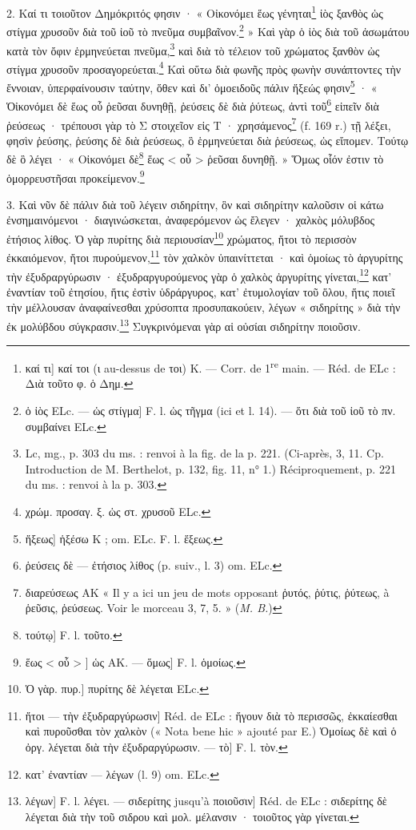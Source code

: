 \documentclass[landscape, a4paper, 11pt, oneside, polutonikogreek, french]{article}
\begin{document}
2. Καί τι τοιοῦτον Δημόκριτός φησιν · « Οἰκονόμει ἕως γένηται\footnote{καί τι] καί τοι (ι au-dessus de τοι) K. --- Corr. de 1\textsuperscript{re} main. --- Réd. de ELc : Διὰ τοῦτο φ. ὁ Δημ.} ἰὸς ξανθὸς ὡς στίγμα χρυσοῦν διὰ τοῦ ἰοῦ τὸ πνεῦμα συμβαῖνον.\footnote{ὁ ἰὸς ELc. --- ὡς στίγμα] F. l. ὡς τῆγμα (ici et l. 14). --- ὅτι διὰ τοῦ ἰοῦ τὸ πν. συμβαίνει ELc.} » Καὶ γὰρ ὁ ἰὸς διὰ τοῦ ἀσωμάτου κατὰ τὸν ὄφιν ἑρμηνεύεται πνεῦμα,\footnote{Lc, mg., p. 303 du ms. : renvoi à la fig. de la p. 221. (Ci-après, 3, 11. Cp. Introduction de M. Berthelot, p. 132, fig. 11, n° 1.) Réciproquement, p. 221 du ms. : renvoi à la p. 303.} καὶ διὰ τὸ τέλειον τοῦ χρώματος ξανθὸν ὠς στίγμα χρυσοῦν προσαγορεύεται.\footnote{χρώμ. προσαγ. ξ. ὡς στ. χρυσοῦ ELc.} Καὶ οὕτω διὰ φωνῆς πρὸς φωνὴν συνάπτοντες τὴν ἔννοιαν, ὑπερφαίνουσιν ταύτην, ὅθεν καὶ δι' ὁμοειδοῦς πάλιν ἥξεώς φησιν\footnote{ἥξεως] ἡξέσω K ; om. ELc. F. l. ἕξεως.} · « Ὁἰκονόμει δὲ ἕως οὗ ῥεῦσαι δυνηθῇ, ῥεύσεις δὲ διὰ ῥύτεως, ἀντὶ τοῦ\footnote{ῥεύσεις δὲ --- ἐτήσιος λίθος (p. suiv., l. 3) om. ELc.} εἰπεῖν διὰ ῥεύσεως · τρέπουσι γὰρ τὸ Σ στοιχεῖον εἰς Τ · χρησάμενος\footnote{διαρεύσεως AK « Il y a ici un jeu de mots opposant ῥυτός, ῥύτις, ῥύτεως, à ῥεῦσις, ῥεύσεως. Voir le morceau 3, 7, 5. » (\emph{M. B.})} (f. 169 r.) τῇ λέξει, φησὶν ῥεύσης, ῥεύσης δὲ διὰ ῥεύσεως, ὃ ἑρμηνεύεται διὰ ῥεύσεως, ὡς εἴπομεν. Τούτῳ δὲ ὃ λέγει · « Οἰκονόμει δὲ\footnote{τούτῳ] F. l. τοῦτο.} ἕως < οὗ > ῥεῦσαι δυνηθῇ. » Ὅμως οἷόν ἐστιν τὸ ὁμορρευστῆσαι προκείμενον.\footnote{ἕως < οὗ > ] ὡς AK. --- ὅμως] F. l. ὁμοίως.}

3. Καὶ νῦν δὲ πάλιν διὰ τοῦ λέγειν σιδηρίτην, ὃν καὶ σιδηρίτην καλοῦσιν οἱ κάτω ἐνσημαινόμενοι · διαγινώσκεται, ἀναφερόμενον ὡς ἔλεγεν · χαλκὸς μόλυβδος ἐτήσιος λίθος. Ὁ γὰρ πυρίτης διὰ περιουσίαν\footnote{Ὁ γὰρ. πυρ.] πυρίτης δὲ λέγεται ELc.} χρώματος, ἤτοι τὸ περισσὸν ἐκκαιόμενον, ἤτοι πυρούμενον,\footnote{ἤτοι --- τὴν ἐξυδραργύρωσιν] Réd. de ELc : ἤγουν διὰ τὸ περισσῶς, ἐκκαίεσθαι καὶ πυροῦσθαι τὸν χαλκὸν (« Nota bene hic » ajouté par E.) Ὁμοίως δὲ καὶ ὁ ὀργ. λέγεται διὰ τὴν ἐξυδραργύρωσιν. --- τὸ] F. l. τὸν.} τὸν χαλκὸν ὑπαινίττεται · καὶ ὁμοίως τὸ ἀργυρίτης τὴν ἐξυδραργύρωσιν · ἐξυδραργυρούμενος γὰρ ὁ χαλκὸς ἀργυρίτης γίνεται,\footnote{κατ' ἐναντίαν --- λέγων (l. 9) om. ELc.} κατ' ἐναντίαν τοῦ ἐτησίου, ἥτις ἐστὶν ὑδράργυρος, κατ' ἐτυμολογίαν τοῦ ὅλου, ἥτις ποιεῖ τὴν μέλλουσαν ἀναφαίνεσθαι χρύσοπτα προσυπακούειν, λέγων « σιδηρίτης » διὰ τὴν ἐκ μολύβδου σύγκρασιν.\footnote{λέγων] F. l. λέγει. --- σιδερίτης jusqu'à ποιοῦσιν] Réd. de ELc : σιδερίτης δὲ λέγεται διὰ τὴν τοῦ σιδρου καὶ μολ. μέλανσιν · τοιοῦτος γὰρ γίνεται.} Συγκρινόμεναι γὰρ αἱ οὐσίαι σιδηρίτην ποιοῦσιν.
\end{document}
